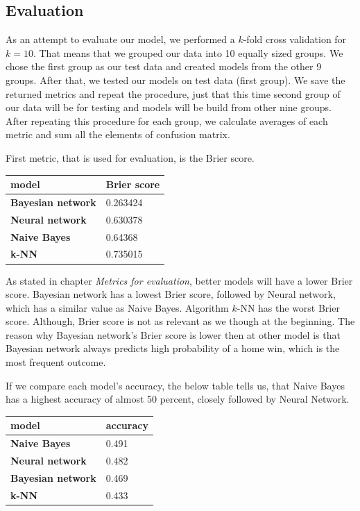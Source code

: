 \documentclass[conference]{IEEEtran}
\begin{document}
\subsection{Evaluation}

As an attempt to evaluate our model, we performed a $k$-fold cross validation
for $k=10$. That means that we grouped our data into 10 equally sized groups. We 
chose the first group as our test data and created models from the other 9 
groups. After that, we tested our models on test data (first group). We save the
returned metrics and repeat the procedure, just that this time second group of our data 
will be for testing and models will be build from other nine groups. After repeating this
procedure for each group, we calculate averages of each metric and sum all the elements
of confusion matrix. 

First metric, that is used for evaluation, is the Brier score. 

\begin{table}[!ht]
    \centering
    \begin{tabular}{ll}
        model & Brier score \\ \hline
        \textbf{Bayesian network} & 0.263424 \\ 
        \textbf{Neural network} & 0.630378 \\ 
        \textbf{Naive Bayes} & 0.64368 \\ 
        \textbf{k-NN} & 0.735015 \\ 
    \end{tabular}
\end{table}

As stated in chapter \textit{Metrics for evaluation}, better models will have a lower 
Brier score. Bayesian network has a lowest Brier score, followed by Neural network, which has 
a similar value as Naive Bayes. Algorithm $k$-NN has the worst Brier score. Although, Brier score
is not as relevant as we though at the beginning. The reason why Bayesian network's Brier score
is lower then at other model is that Bayesian network always predicts high probability of a home
win, which is the most frequent outcome.

If we compare each model's accuracy, the below table tells us, that Naive Bayes has a 
highest accuracy of almost 50 percent, closely followed by Neural Network.

\begin{table}[!ht]
    \centering
    \begin{tabular}{ll}
        model & accuracy \\ \hline
        \textbf{Naive Bayes} & 0.491 \\ 
        \textbf{Neural network} & 0.482 \\ 
        \textbf{Bayesian network} & 0.469 \\ 
        \textbf{k-NN} & 0.433 \\ 
    \end{tabular}
\end{table}
\end{document}
